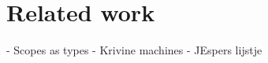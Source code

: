
\chapter{\label{chap:related-work}Related work}

- Scopes as types
- Krivine machines
- JEspers lijstje
